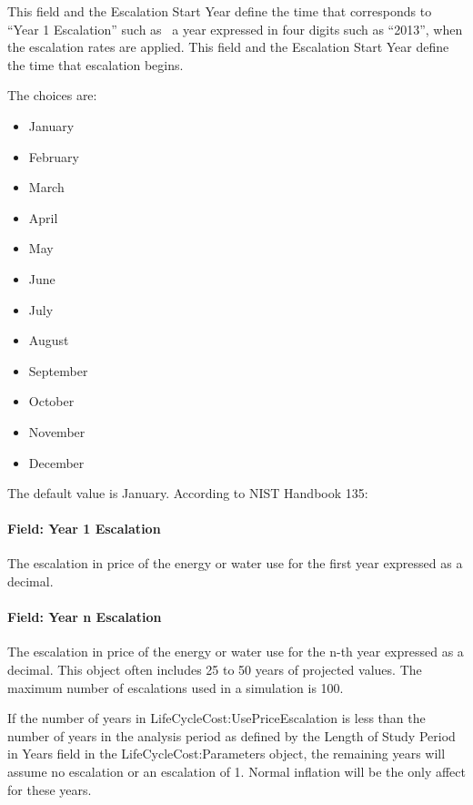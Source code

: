 This field and the Escalation Start Year define the time that corresponds to ``Year 1 Escalation'' such as~ a year expressed in four digits such as ``2013'', when the escalation rates are applied. This field and the Escalation Start Year define the time that escalation begins.

The choices are:

\begin{itemize}
\item
  January
\item
  February
\item
  March
\item
  April
\item
  May
\item
  June
\item
  July
\item
  August
\item
  September
\item
  October
\item
  November
\item
  December
\end{itemize}

The default value is January. According to NIST Handbook 135:

\paragraph{Field: Year 1 Escalation}\label{field-year-1-escalation}

The escalation in price of the energy or water use for the first year expressed as a decimal.

\paragraph{Field: Year n Escalation}\label{field-year-n-escalation}

The escalation in price of the energy or water use for the n-th year expressed as a decimal. This object often includes 25 to 50 years of projected values. The maximum number of escalations used in a simulation is 100.

If the number of years in LifeCycleCost:UsePriceEscalation is less than the number of years in the analysis period as defined by the Length of Study Period in Years field in the LifeCycleCost:Parameters object, the remaining years will assume no escalation or an escalation of 1. Normal inflation will be the only affect for these years.

